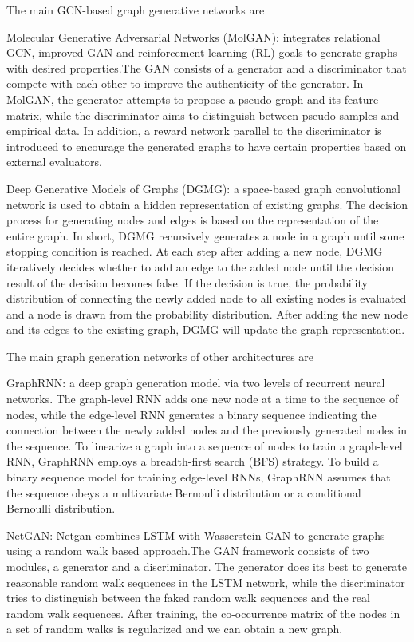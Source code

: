 \documentclass[11pt,en]{elegantpaper}
\begin{document}
The main GCN-based graph generative networks are

Molecular Generative Adversarial Networks (MolGAN): integrates relational GCN, improved GAN and reinforcement learning (RL) goals to generate graphs with desired properties.The GAN consists of a generator and a discriminator that compete with each other to improve the authenticity of the generator. In MolGAN, the generator attempts to propose a pseudo-graph and its feature matrix, while the discriminator aims to distinguish between pseudo-samples and empirical data. In addition, a reward network parallel to the discriminator is introduced to encourage the generated graphs to have certain properties based on external evaluators.

Deep Generative Models of Graphs (DGMG): a space-based graph convolutional network is used to obtain a hidden representation of existing graphs. The decision process for generating nodes and edges is based on the representation of the entire graph. In short, DGMG recursively generates a node in a graph until some stopping condition is reached. At each step after adding a new node, DGMG iteratively decides whether to add an edge to the added node until the decision result of the decision becomes false. If the decision is true, the probability distribution of connecting the newly added node to all existing nodes is evaluated and a node is drawn from the probability distribution. After adding the new node and its edges to the existing graph, DGMG will update the graph representation.

The main graph generation networks of other architectures are

GraphRNN: a deep graph generation model via two levels of recurrent neural networks. The graph-level RNN adds one new node at a time to the sequence of nodes, while the edge-level RNN generates a binary sequence indicating the connection between the newly added nodes and the previously generated nodes in the sequence. To linearize a graph into a sequence of nodes to train a graph-level RNN, GraphRNN employs a breadth-first search (BFS) strategy. To build a binary sequence model for training edge-level RNNs, GraphRNN assumes that the sequence obeys a multivariate Bernoulli distribution or a conditional Bernoulli distribution.

NetGAN: Netgan combines LSTM with Wasserstein-GAN to generate graphs using a random walk based approach.The GAN framework consists of two modules, a generator and a discriminator. The generator does its best to generate reasonable random walk sequences in the LSTM network, while the discriminator tries to distinguish between the faked random walk sequences and the real random walk sequences. After training, the co-occurrence matrix of the nodes in a set of random walks is regularized and we can obtain a new graph. 
\end{document}
